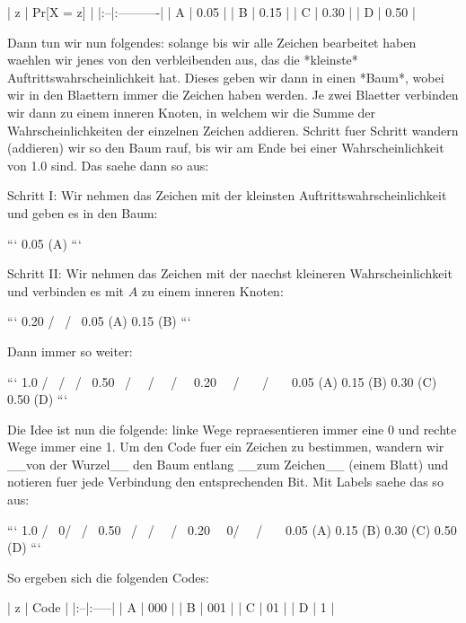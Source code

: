 | z | Pr[X = z] |
|:--|:----------|
| A |    0.05   |
| B |    0.15   |
| C |    0.30   |
| D |    0.50   |

Dann tun wir nun folgendes: solange bis wir alle Zeichen bearbeitet haben
waehlen wir jenes von den verbleibenden aus, das die *kleinste*
Auftrittswahrscheinlichkeit hat. Dieses geben wir dann in einen *Baum*, wobei
wir in den Blaettern immer die Zeichen haben werden. Je zwei Blaetter verbinden
wir dann zu einem inneren Knoten, in welchem wir die Summe der
Wahrscheinlichkeiten der einzelnen Zeichen addieren. Schritt fuer Schritt
wandern (addieren) wir so den Baum rauf, bis wir am Ende bei einer
Wahrscheinlichkeit von 1.0 sind. Das saehe dann so aus:

Schritt I: Wir nehmen das Zeichen mit der kleinsten Auftrittswahrscheinlichkeit
           und geben es in den Baum:

```
0.05 (A)
```

Schritt II: Wir nehmen das Zeichen mit der naechst kleineren Wahrscheinlichkeit
            und verbinden es mit $A$ zu einem inneren Knoten:

```
      0.20
     /     \
    /       \
0.05 (A)  0.15 (B)
```

Dann immer so weiter:


```
                 1.0
                /   \
               /     \
              /       \
            0.50       \
           /    \       \
          /      \       \
         /        \       \
      0.20         \       \
     /     \        \       \
    /       \        \       \
0.05 (A)  0.15 (B) 0.30 (C) 0.50 (D)
```

Die Idee ist nun die folgende: linke Wege repraesentieren immer eine 0 und
rechte Wege immer eine 1. Um den Code fuer ein Zeichen zu bestimmen, wandern wir
__von der Wurzel__ den Baum entlang __zum Zeichen__ (einem Blatt) und notieren
fuer jede Verbindung den entsprechenden Bit. Mit Labels saehe das so aus:

```
                 1.0
                /   \
              0/     \
              /       \
            0.50       \
           /    \       \1
         0/      \       \
         /        \1      \
      0.20         \       \
    0/     \1       \       \
    /       \        \       \
0.05 (A)  0.15 (B) 0.30 (C) 0.50 (D)
```

So ergeben sich die folgenden Codes:

| z | Code |
|:--|:-----|
| A | 000  |
| B | 001  |
| C | 01   |
| D | 1    |


